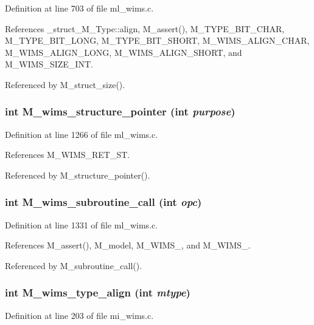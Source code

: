 Definition at line 703 of file ml\_\-wims.c.

References \_\-struct\_\-M\_\-Type::align, M\_\-assert(), M\_\-TYPE\_\-BIT\_\-CHAR, M\_\-TYPE\_\-BIT\_\-LONG, M\_\-TYPE\_\-BIT\_\-SHORT, M\_\-WIMS\_\-ALIGN\_\-CHAR, M\_\-WIMS\_\-ALIGN\_\-LONG, M\_\-WIMS\_\-ALIGN\_\-SHORT, and M\_\-WIMS\_\-SIZE\_\-INT.

Referenced by M\_\-struct\_\-size().
\subsubsection{\setlength{\rightskip}{0pt plus 5cm}int M\_\-wims\_\-structure\_\-pointer (int {\em purpose})}\label{m__wims_8h_ca63b33e49ddd314061fc0d1f6060726}




Definition at line 1266 of file ml\_\-wims.c.

References M\_\-WIMS\_\-RET\_\-ST.

Referenced by M\_\-structure\_\-pointer().
\subsubsection{\setlength{\rightskip}{0pt plus 5cm}int M\_\-wims\_\-subroutine\_\-call (int {\em opc})}\label{m__wims_8h_7af3bb2870d3ec824153339ddaa32e45}




Definition at line 1331 of file ml\_\-wims.c.

References M\_\-assert(), M\_\-model, M\_\-WIMS\_, and M\_\-WIMS\_.

Referenced by M\_\-subroutine\_\-call().
\subsubsection{\setlength{\rightskip}{0pt plus 5cm}int M\_\-wims\_\-type\_\-align (int {\em mtype})}\label{m__wims_8h_dd980bb7a24bc13fd60733caf4d9ac74}




Definition at line 203 of file mi\_\-wims.c.

